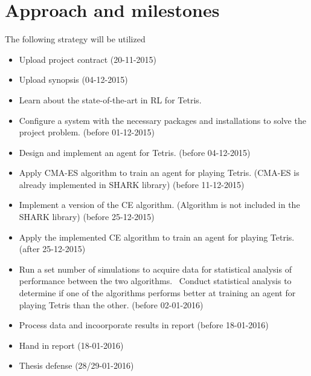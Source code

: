 \section*{Approach and milestones}
The following strategy will be utilized
\begin{itemize}
\item Upload project contract (20-11-2015)
\item Upload synopsis (04-12-2015)
\item Learn about the state-of-the-art in RL for Tetris.
\item Configure a system with the necessary packages and installations to solve the project problem. (before 01-12-2015)
\item Design and implement an agent for Tetris. (before 04-12-2015)
\item Apply CMA-ES algorithm to train an agent for playing Tetris. (CMA-ES is already implemented in SHARK library)
 (before 11-12-2015)
\item Implement a version of the CE algorithm. (Algorithm is not included in the SHARK library) (before 25-12-2015)
\item Apply the implemented CE algorithm to train an agent for playing Tetris. (after 25-12-2015)
\item Run a set number of simulations to acquire data for statistical analysis of performance between the two algorithms.
\ Conduct statistical analysis to determine if one of the algorithms performs better at training an agent for playing Tetris than the other. (before 02-01-2016)
\item Process data and incoorporate results in report (before 18-01-2016)
\item Hand in report (18-01-2016)
\item Thesis defense (28/29-01-2016)
\end{itemize}